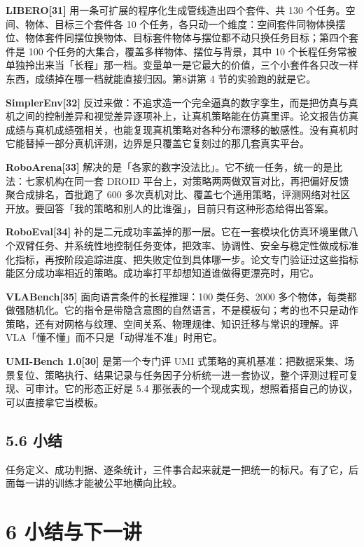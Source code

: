 \documentclass[
  chinese,
]{ctexart}
\begin{document}
\textbf{LIBERO{[}31{]}} 用一条可扩展的程序化生成管线造出四个套件、共 130
个任务。空间、物体、目标三个套件各 10
个任务，各只动一个维度：空间套件同物体换摆位、物体套件同摆位换物体、目标套件物体与摆位都不动只换任务目标；第四个套件是
100 个任务的大集合，覆盖多样物体、摆位与背景，其中 10
个长程任务常被单独拎出来当「长程」那一档。变量单一是它最大的价值，三个小套件各只改一样东西，成绩掉在哪一档就能直接归因。第8讲第
4 节的实验跑的就是它。

\textbf{SimplerEnv{[}32{]}}
反过来做：不追求造一个完全逼真的数字孪生，而是把仿真与真机之间的控制差异和视觉差异逐项补上，让真机策略能在仿真里评。论文报告仿真成绩与真机成绩强相关，也能复现真机策略对各种分布漂移的敏感性。没有真机时它能替掉一部分真机评测，边界是只覆盖它复刻过的那几套真实平台。

\textbf{RoboArena{[}33{]}}
解决的是「各家的数字没法比」。它不统一任务，统一的是比法：七家机构在同一套
DROID 平台上，对策略两两做双盲对比，再把偏好反馈聚合成排名，首批跑了 600
多次真机对比、覆盖七个通用策略，评测网络对社区开放。要回答「我的策略和别人的比谁强」，目前只有这种形态给得出答案。

\textbf{RoboEval{[}34{]}}
补的是二元成功率盖掉的那一层。它在一套模块化仿真环境里做八个双臂任务、并系统性地控制任务变体，把效率、协调性、安全与稳定性做成标准化指标，再按阶段追踪进度、把失败定位到具体哪一步。论文专门验证过这些指标能区分成功率相近的策略。成功率打平却想知道谁做得更漂亮时，用它。

\textbf{VLABench{[}35{]}} 面向语言条件的长程推理：100 类任务、2000
多个物体，每类都做强随机化。它的指令是带隐含意图的自然语言，不是模板句；考的也不只是动作策略，还有对网格与纹理、空间关系、物理规律、知识迁移与常识的理解。评
VLA「懂不懂」而不只是「动得准不准」时用它。

\textbf{UMI-Bench 1.0{[}30{]}} 是第一个专门评 UMI
式策略的真机基准：把数据采集、场景复位、策略执行、结果记录与任务因子分析统一进一套协议，整个评测过程可复现、可审计。它的形态正好是
5.4 那张表的一个现成实现，想照着搭自己的协议，可以直接拿它当模板。

\subsection{5.6 小结}\label{ux5c0fux7ed3}

任务定义、成功判据、逐条统计，三件事合起来就是一把统一的标尺。有了它，后面每一讲的训练才能被公平地横向比较。

\section{6 小结与下一讲}\label{ux5c0fux7ed3ux4e0eux4e0bux4e00ux8bb2}
\end{document}
